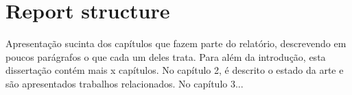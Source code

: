 \section{Report structure}

Apresentação sucinta dos capítulos que fazem parte do relatório, descrevendo em poucos parágrafos o que cada um deles trata. 
Para além da introdução, esta dissertação contém mais x capítulos. No capítulo 2, é descrito o estado da arte e são apresentados trabalhos relacionados. No capítulo 3...




